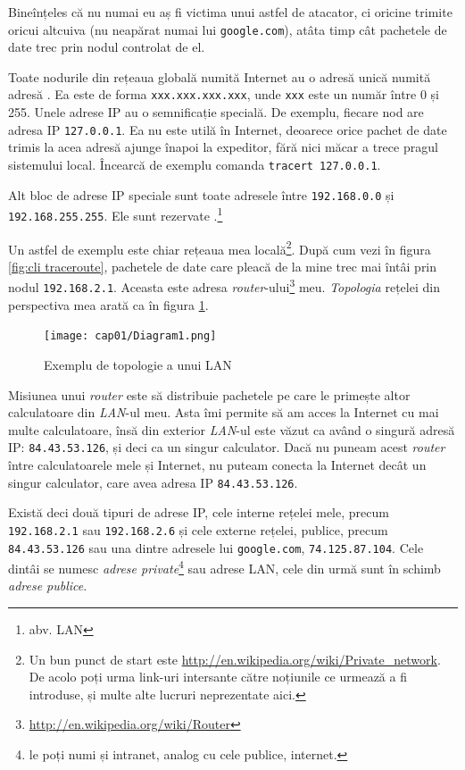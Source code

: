 Bineînțeles că nu numai eu aș fi
victima unui astfel de atacator, ci oricine trimite 
oricui altcuiva (nu neapărat numai lui \texttt{google.com}), atâta timp cât pachetele
de date trec prin nodul controlat de el.

Toate nodurile din rețeaua globală numită Internet au o adresă unică numită adresă
. Ea este de forma \texttt{xxx.xxx.xxx.xxx}, unde \texttt{xxx} este un număr
între 0 și 255. Unele adrese IP au o semnificație specială. De exemplu, fiecare
nod are adresa IP \texttt{127.0.0.1}. Ea nu este utilă în Internet, deoarece orice pachet
de date trimis la acea adresă ajunge înapoi la expeditor, fără nici măcar a trece
pragul sistemului local. Încearcă de exemplu comanda \texttt{tracert 127.0.0.1}.

Alt bloc de adrese IP speciale sunt toate adresele între \texttt{192.168.0.0} și
\texttt{192.168.255.255}. Ele sunt rezervate .\footnote{abv. LAN}

Un astfel de exemplu este chiar rețeaua mea
locală\footnote{Un bun punct de start este \url{http://en.wikipedia.org/wiki/Private_network}.
De acolo poți urma link-uri intersante către noțiunile ce urmează a fi introduse,
și multe alte lucruri neprezentate aici.}.
După cum vezi în figura \ref{fig:cli traceroute},
pachetele de date care pleacă de la mine trec mai întâi prin nodul \texttt{192.168.2.1}.
Aceasta este adresa \textsl{router}-ului\footnote{\url{http://en.wikipedia.org/wiki/Router}}
meu. \textsl{Topologia} rețelei din perspectiva mea
arată ca în figura \ref{fig:topologie}.

\begin{figure}[h]
  \centering
    \texttt{[image: cap01/Diagram1.png]}
  \caption{Exemplu de topologie a unui LAN}
  \label{fig:topologie}
\end{figure}

Misiunea unui \textsl{router} este să distribuie pachetele
pe care le primește altor calculatoare din \textsl{LAN}-ul meu. Asta îmi permite să am acces
la Internet cu mai multe calculatoare, însă din exterior \textsl{LAN}-ul este văzut ca
având o singură adresă IP: \texttt{84.43.53.126}, și deci ca un singur calculator. Dacă
nu puneam acest \textsl{router} între calculatoarele mele și Internet, nu puteam conecta
la Internet decât un singur calculator, care avea adresa IP \texttt{84.43.53.126}.

\sloppy Există deci două tipuri de adrese IP, cele interne rețelei mele, precum \texttt{192.168.2.1}
sau \texttt{192.168.2.6} și cele externe rețelei, publice, precum \texttt{84.43.53.126} sau una
dintre adresele lui \texttt{google.com}, \texttt{74.125.87.104}.
Cele dintâi se numesc \textsl{adrese private}\footnote{le poți numi și {\glqq}intranet{\grqq},
analog cu cele publice, {\glqq}internet{\grqq}.}
sau adrese LAN, cele din urmă sunt în schimb \textsl{adrese publice}.

